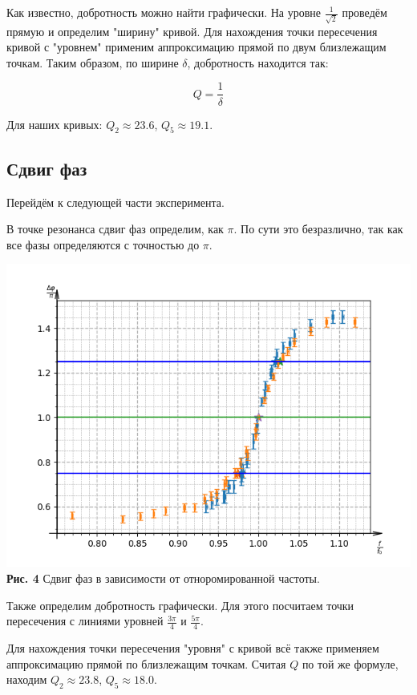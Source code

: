 \documentclass[a4paper, 12pt]{article}%
\begin{document}
Как известно, добротность можно найти графически. На уровне $\frac{1}{\sqrt{2}}$ проведём прямую и определим "ширину" кривой. Для нахождения точки пересечения кривой с "уровнем" применим аппроксимацию прямой по двум близлежащим точкам. Таким образом, по ширине $\delta$, добротность находится так:

\[Q=\frac{1}{\delta}\]


Для наших кривых:
$Q_2 \approx 23.6$, 
$Q_5 \approx 19.1$.
\subsection*{Сдвиг фаз}
Перейдём к следующей части эксперимента. %

В точке резонанса сдвиг фаз определим, как $\pi$. По сути это безразлично, так как все фазы определяются с точностью до $\pi$.

\begin{center}
\includegraphics[width=\textwidth]{Figure_3.png}\\
\textbf{Рис. 4} Сдвиг фаз в зависимости от отноромированной частоты.
\end{center}

Также определим добротность графически. Для этого посчитаем точки пересечения с линиями уровней $\frac{3\pi}{4}$ и $\frac{5\pi}{4}$.

Для нахождения точки пересечения "уровня" с кривой всё также применяем аппроксимацию прямой по близлежащим точкам. Считая $Q$ по той же формуле, находим 
$Q_2 \approx 23.8$, 
$Q_5 \approx 18.0$.
\end{document}
